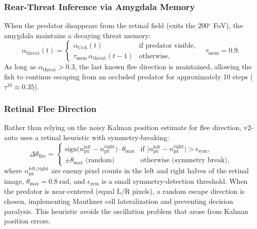 \documentclass[11pt,a4paper]{article}
\begin{document}
\subsubsection{Rear-Threat Inference via Amygdala Memory}

When the predator disappears from the retinal field (exits the
200$^\circ$ FoV), the amygdala maintains a decaying threat memory:
\begin{equation}\label{eq:rear_threat}
  \alpha_\mathrm{threat}(t) =
  \begin{cases}
    \alpha_\mathrm{CeA}(t) & \text{if predator visible}, \\
    \tau_\mathrm{mem}\,\alpha_\mathrm{threat}(t-1) & \text{otherwise},
  \end{cases}
  \quad \tau_\mathrm{mem} = 0.9.
\end{equation}
As long as $\alpha_\mathrm{threat} > 0.3$, the last known flee direction
is maintained, allowing the fish to continue escaping from an
occluded predator for approximately 10 steps ($\tau^{10} \approx 0.35$).

\subsubsection{Retinal Flee Direction}

Rather than relying on the noisy Kalman position estimate for
flee direction, v2-auto uses a retinal heuristic with symmetry-breaking:
\begin{equation}\label{eq:retinal_flee}
  \Delta\theta_\mathrm{flee} =
  \begin{cases}
    \mathrm{sign}\!\bigl(n_\mathrm{px}^\mathrm{left} - n_\mathrm{px}^\mathrm{right}\bigr)
      \cdot \theta_\mathrm{max} & \text{if } \bigl|n_\mathrm{px}^\mathrm{left}
      - n_\mathrm{px}^\mathrm{right}\bigr| > \epsilon_\mathrm{sym}, \\
    \pm\theta_\mathrm{max} \text{ (random)} & \text{otherwise (symmetry break)},
  \end{cases}
\end{equation}
where $n_\mathrm{px}^\mathrm{left/right}$ are enemy pixel counts in
the left and right halves of the retinal image,
$\theta_\mathrm{max} = 0.8~\text{rad}$, and $\epsilon_\mathrm{sym}$
is a small symmetry-detection threshold.
When the predator is near-centered (equal L/R pixels), a random
escape direction is chosen, implementing Mauthner cell lateralization
and preventing decision paralysis.
This heuristic avoids the oscillation problem that arose from
Kalman position errors.
\end{document}
